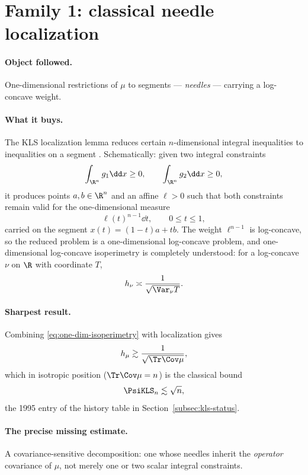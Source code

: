 \documentclass[../../main.tex]{subfiles}
\begin{document}
\section{Family 1: classical needle localization}
\label{sec:family-needles}

\paragraph{Object followed.}
One-dimensional restrictions of $\mu$ to segments --- \emph{needles} --- carrying a log-concave
weight.

\paragraph{What it buys.}
The KLS localization lemma reduces certain $n$-dimensional integral inequalities to inequalities
on a segment \cite{KannanLovaszSimonovits1995}. Schematically: given two integral constraints
\[
  \int_{\R^n}g_1\dd x\ge0,\qquad \int_{\R^n}g_2\dd x\ge0,
\]
it produces points $a,b\in\R^n$ and an affine $\ell>0$ such that both constraints remain valid for
the one-dimensional measure
\begin{equation}
  \ell(t)^{n-1}\dd t,\qquad 0\le t\le1,
  \label{eq:needle-measure}
\end{equation}
carried on the segment $x(t)=(1-t)a+tb$. The weight $\ell^{n-1}$ is log-concave, so the reduced
problem is a one-dimensional log-concave problem, and one-dimensional log-concave isoperimetry is
completely understood: for a log-concave $\nu$ on $\R$ with coordinate $T$,
\begin{equation}
  h_\nu\asymp\frac1{\sqrt{\Var_\nu T}} .
  \label{eq:one-dim-isoperimetry}
\end{equation}

\paragraph{Sharpest result.}
Combining \eqref{eq:one-dim-isoperimetry} with localization gives
\begin{equation}
  h_\mu\gtrsim\frac1{\sqrt{\Tr\Cov\mu}},
  \label{eq:needle-bound}
\end{equation}
which in isotropic position ($\Tr\Cov\mu=n$) is the classical bound
\[
  \PsiKLS_n\lesssim\sqrt n ,
\]
the 1995 entry of the history table in Section~\ref{subsec:kls-status}.

\paragraph{The precise missing estimate.}
A covariance-sensitive decomposition: one whose needles inherit the \emph{operator} covariance of
$\mu$, not merely one or two scalar integral constraints.
\end{document}
